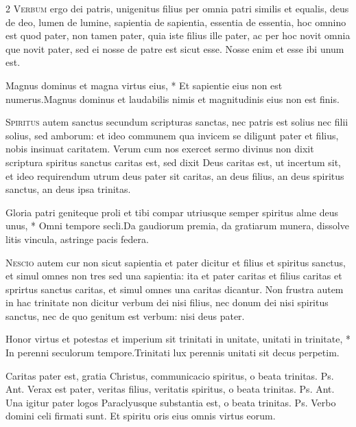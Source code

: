 \begin{multicols*}{2}
\lettrine[lines=2]{\zallmancaps \color{Blue} V}{erbum} ergo dei patris, unigenitus filius per omnia patri similis et equalis, deus de deo, lumen de lumine, sapientia de sapientia, essentia de essentia, hoc omnino est quod pater, non tamen pater, quia iste filius ille pater, ac per hoc novit omnia que novit pater, sed ei nosse de patre est sicut esse. Nosse enim et esse ibi unum est.
\begin{responsory}
{Magnus dominus et magna virtus eius, * Et sapientie eius non est numerus.}{Magnus dominus et laudabilis nimis et magnitudinis eius non est finis.}
\end{responsory}%
\lettrine[lines=2]{\zallmancaps \color{Red} S}{piritus} autem sanctus secundum scripturas sanctas, nec patris est solius nec filii solius, sed amborum: et ideo communem qua invicem se diligunt pater et filius, nobis insinuat caritatem. Verum cum nos exercet sermo divinus non dixit scriptura spiritus sanctus caritas est, sed dixit Deus caritas est, ut incertum sit, et ideo requirendum utrum deus pater sit caritas, an deus filius, an deus spiritus sanctus, an deus ipsa trinitas.
\begin{responsory}
{Gloria patri geniteque proli et tibi compar utriusque semper spiritus alme deus unus, * Omni tempore secli.}{Da gaudiorum premia, da gratiarum munera, dissolve litis vincula, astringe pacis federa.}
\end{responsory}%
\lettrine[lines=2]{\zallmancaps \color{Blue} N}{escio} autem cur non sicut sapientia et pater dicitur et filius et spiritus sanctus, et simul omnes non tres sed una sapientia: ita et pater caritas et filius caritas et sprirtus sanctus caritas, et simul omnes una caritas dicantur. Non frustra autem in hac trinitate non dicitur verbum dei nisi filius, nec donum dei nisi spiritus sanctus, nec de quo genitum est verbum: nisi deus pater.
\begin{responsory-doxology}
{Honor virtus et potestas et imperium sit trinitati in unitate, unitati in trinitate, * In perenni seculorum tempore.}{Trinitati lux perennis unitati sit decus perpetim.}
\end{responsory-doxology}%
 Caritas pater est, gratia Christus, communicacio spiritus, o beata trinitas. {\color{Red} Ps.}  {\color{Red} Ant.} Verax est pater, veritas filius, veritatis spiritus, o beata trinitas. {\color{Red} Ps.}  {\color{Red} Ant.} Una igitur pater logos Paraclyusque substantia est, o beata trinitas. {\color{Red} Ps.}  \V Verbo domini celi firmati sunt. \R Et spiritu oris eius omnis virtus eorum.

\end{multicols*}
